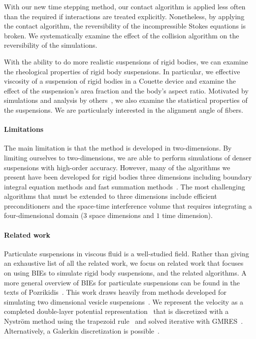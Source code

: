 \documentclass[preprint, 10pt]{elsarticle}
\begin{document}
With our new time stepping method, our contact algorithm is applied less
often than the required if interactions are treated explicitly.
Nonetheless, by applying the contact algorithm, the reversibility of the
incompressible Stokes equations is broken.  We systematically examine
the effect of the collision algorithm on the reversibility of the
simulations.

With the ability to do more realistic suspensions of rigid bodies, we
can examine the rheological properties of rigid body suspensions.  In
particular, we effective viscosity of a suspension of rigid bodies in a
Couette device and examine the effect of the suspension's area fraction
and the body's aspect ratio.  Motivated by simulations and analysis by
others~\cite{}, we also examine the statistical properties of the
suspensions.  We are particularly interested in the alignment angle of
fibers.

\paragraph{Limitations} The main limitation is that the method is
developed in two-dimensions.  By limiting ourselves to two-dimensions,
we are able to perform simulations of denser suspensions with high-order
accuracy.  However, many of the algorithms we present have been
developed for rigid bodies three dimensions including boundary integral
equation methods and fast summation methods~\cite{cor-gre-rac-vee2017,
kli-tor2014, kli-tor2016}.  The most challenging algorithms that must be
extended to three dimensions include efficient preconditioners and the
space-time interference volume that requires integrating a
four-dimensional domain ($3$ space dimensions and $1$ time dimension).


\paragraph{Related work} Particulate suspensions in viscous fluid is a
well-studied field.  Rather than giving an exhaustive list of all the
related work, we focus on related work that focuses on using BIEs to
simulate rigid body suspensions, and the related algorithms.  A more
general overview of BIEs for particulate suspensions can be found in the
texts of Pozrikidis~\cite{Pozrikidis1992, Guazzelli2011, Karrila1991}.
This work draws heavily from methods developed for simulating two
dimensional vesicle suspensions~\cite{Quaife2014, Quaife2015,
qua-bir2016, Rahimian2010, Lu2017}.  We represent the velocity as a completed double-layer potential representation~\cite{Power1987,
Power1993, Karrila1989} that is discretized with a Nystr\"om method
using the trapezoid rule~\cite{Trefethen2014} and solved iterative with
GMRES~\cite{Saad1986}.  Alternatively, a Galerkin discretization is
possible~\cite{Mammoli1999, Mammoli2002, Mammoli2006}.
\end{document}
